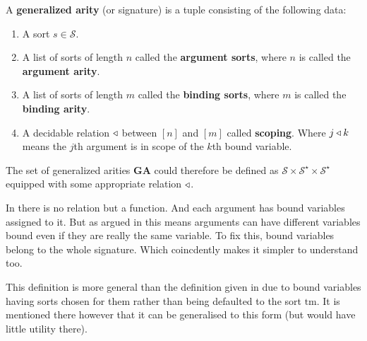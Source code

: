 \begin{defin}
    A \textbf{generalized arity} (or signature) is a tuple consisting of the following data:
    
    \begin{enumerate}
         \parsep
        \item A sort $s \in \mathcal{S}$.
        
        \item A list of sorts of length $n$ called the \textbf{argument sorts}, where $n$ is called the \textbf{argument arity}.
        
        \item A list of sorts of length $m$ called the \textbf{binding sorts}, where $m$ is called the \textbf{binding arity}.
        
        \item A decidable relation $\triangleleft$ between $[n]$ and $[m]$ called \textbf{scoping}. Where $j \triangleleft k$ means the $j$th argument is in scope of the $k$th bound variable.
    \end{enumerate}
    
    The set of generalized arities $\mathbf{GA}$ could therefore be defined as $\mathcal{S} \times \mathcal{S}^\star  \times \mathcal{S}^\star$ equipped with some appropriate relation $\triangleleft$.
\end{defin}

\begin{remark}
    In \cite{harper_2016} there is no relation but a function. And each argument has bound variables assigned to it. But as argued in \cite{nlab:initiality_project_-_raw_syntax} this means arguments can have different variables bound even if they are really the same variable. To fix this, bound variables belong to the whole signature. Which coincdently makes it simpler to understand too.
    
    This definition is more general than the definition given in \cite{nlab:initiality_project_-_raw_syntax} due to bound variables having sorts chosen for them rather than being defaulted to the sort $\mathrm{tm}$. It is mentioned there however that it can be generalised to this form (but would have little utility there).
\end{remark}

